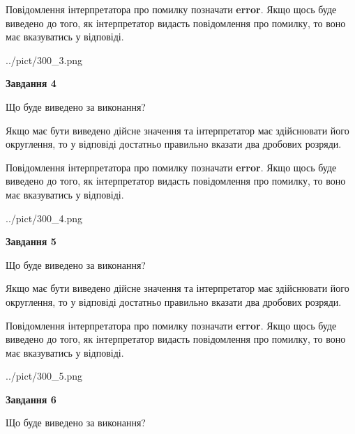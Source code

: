 \documentclass[12pt, ukrainian]{article}
\begin{document}
{\begin {Large}
Повідомлення інтерпретатора про помилку позначати \textbf{error}.
Якщо щось буде виведено до того, як інтерпретатор видасть повідомлення про помилку, 
то воно має вказуватись у відповіді. \par

\begin{center}
	{../pict/300_3.png}
\end{center}
\newpage

{\begin {center}\textbf{Завдання 4}\end {center}}\par
Що буде виведено за виконання? \par

Якщо має бути виведено дійсне значення та інтерпретатор має здійснювати його округлення, 
то у відповіді достатньо правильно вказати два дробових розряди.

Повідомлення інтерпретатора про помилку позначати \textbf{error}.
Якщо щось буде виведено до того, як інтерпретатор видасть повідомлення про помилку, 
то воно має вказуватись у відповіді. \par

\begin{center}
	{../pict/300_4.png}
\end{center}
\newpage

{\begin {center}\textbf{Завдання 5}\end {center}}\par
Що буде виведено за виконання? \par

Якщо має бути виведено дійсне значення та інтерпретатор має здійснювати його округлення, 
то у відповіді достатньо правильно вказати два дробових розряди.

Повідомлення інтерпретатора про помилку позначати \textbf{error}.
Якщо щось буде виведено до того, як інтерпретатор видасть повідомлення про помилку, 
то воно має вказуватись у відповіді. \par

\begin{center}
	{../pict/300_5.png}
\end{center}
\newpage

{\begin {center}\textbf{Завдання 6}\end {center}}\par
Що буде виведено за виконання? \par


\end{Large}}
\end{document}
